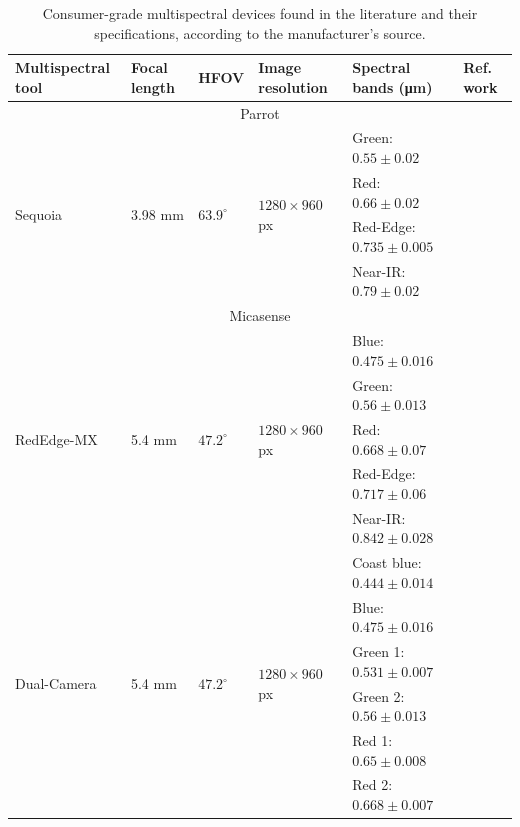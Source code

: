 \renewcommand{\arraystretch}{1.2}
\begin{table}[htb]
    \caption{Consumer-grade multispectral devices found in the literature and their specifications, according to the manufacturer's source.}
    \label{table:multispectral_devices}
    \begin{tabular}{llllll}
        \toprule
        Multispectral tool & Focal length & HFOV & Image resolution & Spectral bands (\si{\micro\meter}) & Ref. work \\
        \midrule
        \multicolumn{6}{c}{Parrot}\\
        \cmidrule{1-6}
        \multirow{4}{*}{Sequoia}     & \multirow{4}{*}{3.98 \si{\milli\meter}}   & \multirow{4}{*}{$63.9^{\circ}$}  & \multirow{4}{*}{$1280 \times 960$ px}  & Green: $0.55 \pm 0.02$  & \multirow{4}{*}{\cite{franzini_geometric_2019}}\\
        & & & & Red: $0.66 \pm 0.02$ &\\
        & & & & Red-Edge: $0.735 \pm 0.005$ &\\
        & & & & Near-IR: $0.79 \pm 0.02$ &\\
        \cmidrule{1-6}
        \multicolumn{6}{c}{Micasense}\\
        \cmidrule{1-6}
        \multirow{5}{*}{RedEdge-MX}     & \multirow{5}{*}{5.4 \si{\milli\meter}}   & \multirow{5}{*}{$47.2^{\circ}$}  & \multirow{5}{*}{$1280 \times 960$ px}  & Blue: $0.475 \pm 0.016$     & \multirow{5}{*}{\cite{cunha_prediction_2021, isgro_unmanned_2021}}\\
        & & & & Green: $0.56 \pm 0.013$ &\\
        & & & & Red: $0.668 \pm 0.07$ &\\
        & & & & Red-Edge: $0.717 \pm 0.06$ &\\
        & & & & Near-IR: $0.842 \pm 0.028$ &\\
        \cmidrule{1-6}
        \multirow{10}{*}{Dual-Camera}     & \multirow{10}{*}{5.4 \si{\milli\meter}}   & \multirow{10}{*}{$47.2^{\circ}$}  & \multirow{10}{*}{$1280 \times 960$ px} & Coast blue: $0.444 \pm 0.014$    & \multirow{10}{*}{\cite{chakhvashvili_comparison_2021}}\\
        & & & & Blue: $0.475 \pm 0.016$ &\\
        & & & & Green 1: $0.531 \pm 0.007$ &\\
        & & & & Green 2: $0.56 \pm 0.013$ &\\
        & & & & Red 1: $0.65 \pm 0.008$ &\\
        & & & & Red 2: $0.668 \pm 0.007$ &\\

\end{tabular}
\end{table}
